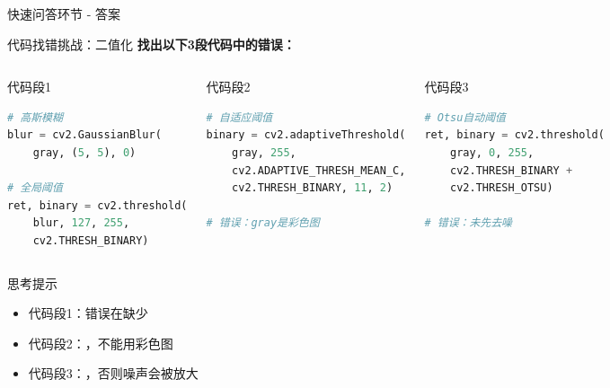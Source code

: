 \begin{frame}[fragile]{快速问答环节 - 答案}
    \vspace{0.5cm}
    \begin{center}
    \end{center}
\end{frame}


\begin{frame}[fragile]{代码找错挑战：二值化}
    \textbf{找出以下3段代码中的错误：}

    \begin{columns}
        \begin{block}{代码段1}
            \begin{lstlisting}[language=Python, basicstyle=\ttfamily\tiny]
# 高斯模糊
blur = cv2.GaussianBlur(
    gray, (5, 5), 0)

# 全局阈值
ret, binary = cv2.threshold(
    blur, 127, 255,
    cv2.THRESH_BINARY)
            \end{lstlisting}
        \end{block}

        \begin{block}{代码段2}
            \begin{lstlisting}[language=Python, basicstyle=\ttfamily\tiny]
# 自适应阈值
binary = cv2.adaptiveThreshold(
    gray, 255,
    cv2.ADAPTIVE_THRESH_MEAN_C,
    cv2.THRESH_BINARY, 11, 2)

# 错误：gray是彩色图
            \end{lstlisting}
        \end{block}

        \begin{block}{代码段3}
            \begin{lstlisting}[language=Python, basicstyle=\ttfamily\tiny]
# Otsu自动阈值
ret, binary = cv2.threshold(
    gray, 0, 255,
    cv2.THRESH_BINARY +
    cv2.THRESH_OTSU)

# 错误：未先去噪
            \end{lstlisting}
        \end{block}
    \end{columns}

    \vspace{0.3cm}
    \begin{alertblock}{思考提示}
        \begin{itemize}
            \item 代码段1：错误在缺少
            \item 代码段2：，不能用彩色图
            \item 代码段3：，否则噪声会被放大
        \end{itemize}
    \end{alertblock}
\end{frame}

